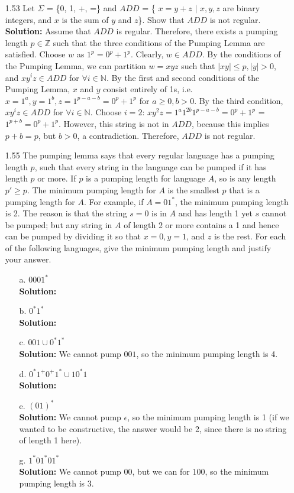 \begin{enumerate}
\item[1.53]Let $\Sigma$ = \{0, 1, +, =\} and $ADD$ = \{ $x = y + z$ $|$ $x, y, z$ are binary integers, and $x$ is the sum of $y$ and $z$\}. Show that $ADD$ is not regular.
\\
\textbf{Solution:} Assume that $ADD$ is regular. Therefore, there exists a pumping length $p \in \mathbb{Z}$ such that the three conditions of the Pumping Lemma are satisfied. Choose $w$ as $1^p=0^p+1^p$. Clearly, $w \in ADD$. By the conditions of the Pumping Lemma, we can partition $w = xyz$ such that $|xy| \le p, |y| > 0$, and $xy^iz \in ADD$ for $\forall i \in \mathbb{N}$. By the first and second conditions of the Pumping Lemma, $x$ and $y$ consist entirely of 1s, i.e. $x = 1^a, y = 1^b, z = 1^{p-a-b}=0^p+1^p$ for $a \ge 0, b > 0$. By the third condition, $xy^iz \in ADD$ for $\forall i \in \mathbb{N}$. Choose $i=2$: $xy^2z = 1^a1^{2b}1^{p-a-b}=0^p+1^p$ = $1^{p+b}=0^p+1^p$. However, this string is not in $ADD$, because this implies $p+b = p$, but $b > 0$, a contradiction. Therefore, $ADD$ is not regular.

\item[1.55]The pumping lemma says that every regular language has a pumping length $p$, such that every string in the language can be pumped if it has length $p$ or more. If $p$ is a pumping length for language $A$, so is any length $p' \ge p$. The minimum pumping length for $A$ is the smallest $p$ that is a pumping length for $A$. For example, if $A = 01^*$, the minimum pumping length is 2. The reason is that the string $s = 0$ is in $A$ and has length 1 yet $s$ cannot be pumped; but any string in $A$ of length 2 or more contains a 1 and hence can be pumped by dividing it so that $x = 0, y = 1$, and $z$ is the rest. For each of the following languages, give the minimum pumping length and justify your answer.
\begin{enumerate}
\item[a.]$0001^*$
\\ 
\textbf{Solution:} \alreadyanswered
\item[b.]$0^*1^*$
\\
\textbf{Solution:} \alreadyanswered
\item[c.]$001 \cup 0^*1^*$
\\
\textbf{Solution:} We cannot pump $001$, so the minimum pumping length is 4. 
\item[d.]$0^*1^+0^+1^* \cup 10^*1$
\\
\textbf{Solution:} \alreadyanswered
\item[e.]$(01)^*$
\\
\textbf{Solution:} We cannot pump $\epsilon$, so the minimum pumping length is 1 (if we wanted to be constructive, the answer would be 2, since there is no string of length 1 here). 
\item[g.]$1^*01^*01^*$
\\
\textbf{Solution:} We cannot pump $00$, but we can for $100$, so the minimum pumping length is 3. 
\end{enumerate}


\end{enumerate}
